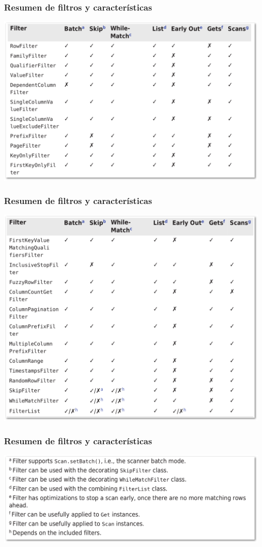 \documentclass[14pt]{beamer}
\begin{document}
\begin{frame}
  \frametitle{Resumen de filtros y características}
  \includegraphics[width=\textwidth]{img/filterlist1}
\end{frame}
\begin{frame}
  \frametitle{Resumen de filtros y características}
  \begin{center}
    \includegraphics[width=.8\textwidth]{img/filterlist2}
  \end{center}
\end{frame}
\begin{frame}
  \frametitle{Resumen de filtros y características}
  \includegraphics[width=\textwidth]{img/filterlist3}
\end{frame}
\end{document}
